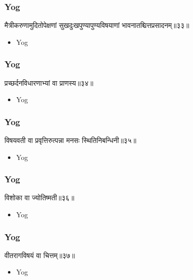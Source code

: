 \begin{frame}[fragile]\frametitle{Yog}
\begin{sanskrit}
मैत्रीकरुणामुदितोपेक्षणां सुखदुःखपुण्यापुण्यविषयाणां भावनातश्चित्तप्रसादनम्॥३३॥
\end{sanskrit}
	\begin{itemize}
	\item Yog 
	\end{itemize}
\end{frame}


\begin{frame}[fragile]\frametitle{Yog}
\begin{sanskrit}
प्रच्छर्दनविधारणाभ्यां वा प्राणस्य॥३४॥
\end{sanskrit}
	\begin{itemize}
	\item Yog 
	\end{itemize}
\end{frame}


\begin{frame}[fragile]\frametitle{Yog}
\begin{sanskrit}
विषयवती वा प्रवृत्तिरुत्पन्ना मनसः स्थितिनिबन्धिनी॥३५॥
\end{sanskrit}
	\begin{itemize}
	\item Yog 
	\end{itemize}
\end{frame}




\begin{frame}[fragile]\frametitle{Yog}
\begin{sanskrit}
विशोका वा ज्योतिष्मती॥३६॥
\end{sanskrit}
	\begin{itemize}
	\item Yog 
	\end{itemize}
\end{frame}




\begin{frame}[fragile]\frametitle{Yog}
\begin{sanskrit}
वीतरागविषयं वा चित्तम्॥३७॥
\end{sanskrit}
	\begin{itemize}
	\item Yog 
	\end{itemize}
\end{frame}


